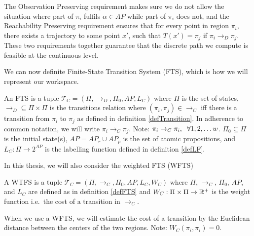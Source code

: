 The Observation Preserving requirement makes sure we do not allow the situation where part of $\pi_i$ fulfils $\alpha \in AP$ while part of $\pi_i$ does not, and the Reachability Preserving requirement ensures that for every point in region $\pi_i$, there exists a trajectory to some point $x'$, such that $T(x') = \pi_j$ if $\pi_i \rightarrow_D \pi_j$. These two requirements together guarantee that the discrete path we compute is feasible at the continuous level.

We can now definite Finite-State Transition System (FTS), which is how we will represent our workspace.
\theoremstyle{definition}
\begin{definition}
\label{defFTS}
An FTS is a tuple $\mathcal{T}_C = (\Pi, \rightarrow_D, \Pi_0, AP,L_C)$ where $\Pi$ is the set of states, $\rightarrow_D \subseteq \Pi \times \Pi$ is the transitions relation where $(\pi_i,\pi_j) \in \rightarrow_C$ iff there is a transition from $\pi_i$ to $\pi_j$ as defined in definition \ref{defTransition}. In adherence to common notation, we will write $\pi_i \rightarrow_C \pi_j$. Note: $\pi_i \rightarrow_C \pi_i, \hspace{0.2cm} \forall 1,2,\dots w$. $\Pi_0 \subseteq \Pi$ is the initial state(s), $AP=AP_r \cup AP_p$ is the set of atomic propositions, and $L_C: \Pi \rightarrow 2^{AP}$ is the labelling function defined in definition \ref{defLF}.
\end{definition}

In this thesis, we will also consider the weighted FTS (WFTS)
\begin{definition}
\label{defFTS}
A WTFS is a tuple $\mathcal{T}_C = (\Pi, \rightarrow_C, \Pi_0, AP,L_C,W_C)$ where $\Pi$, $\rightarrow_C$, $\Pi_0$, $AP$, and $L_C$ are defined as in definition \ref{defFTS} and $W_C: \Pi \times \Pi \rightarrow \mathbb{R}^+$ is the weight function i.e.\ the cost of a transition in $\rightarrow_C$. 
\end{definition}
When we use a WFTS, we will estimate the cost of a transition by the Euclidean distance between the centers of the two regions. Note: $W_C(\pi_i,\pi_i) =0$.

